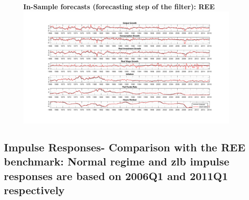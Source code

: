 \documentclass[12pt,reqno]{article}
\numberwithin{equation}{section}
\begin{document}
\begin{figure}[H]
\textbf{In-Sample forecasts (forecasting step of the filter): REE}\\
\includegraphics[height=\textheight,width=\textwidth]{REE_forecast_errors.pdf}
\end{figure}


\subsection*{Impulse Responses- Comparison with the REE benchmark: Normal regime and zlb impulse responses are based on 2006Q1 and 2011Q1 respectively}
\end{document}
